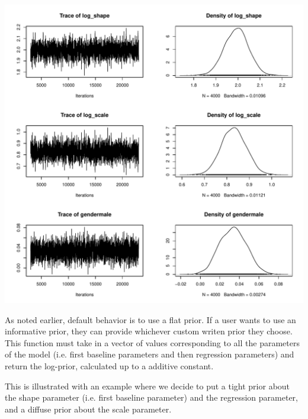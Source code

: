 \documentclass[a4paper]{article}
\begin{document}
\begin{Schunk}
\end{Schunk}
\includegraphics{icenReg-018}

As noted earlier, default behavior is to use a flat prior. If a user wants to use an informative prior, they can provide whichever custom writen prior they choose. This function must take in a vector of values corresponding to all the parameters of the model (i.e. first baseline parameters and then regression parameters) and return the log-prior, calculated up to a additive constant. 

This is illustrated with an example where we decide to put a tight prior about the shape parameter (i.e. first baseline parameter) and the regression parameter, and a diffuse prior about the scale parameter. 
\end{document}

